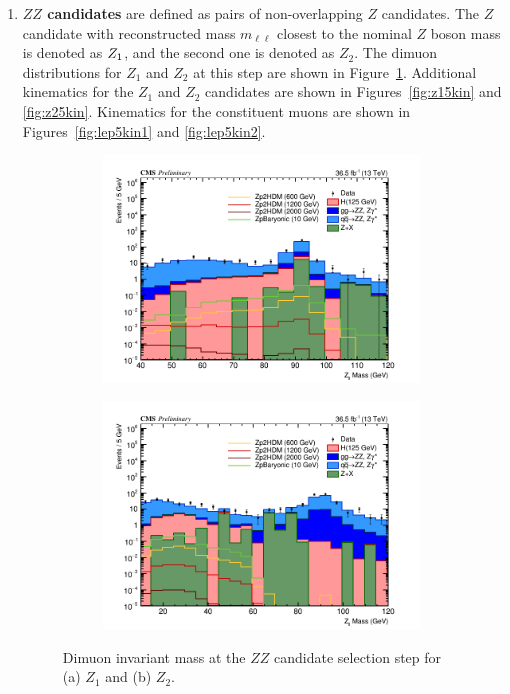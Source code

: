 \begin{enumerate}
\item {\bf $ZZ$ candidates} are defined as pairs of non-overlapping $Z$ candidates.
 The $Z$ candidate with reconstructed mass $m_{\ell\ell}$ closest to the nominal $Z$ boson
 mass is denoted as $Z_1$, and the second one is denoted as $Z_2$. The dimuon distributions for $Z_1$ and $Z_2$ at this step are shown in Figure~\ref{fig:dimuonz5}. Additional kinematics for the $Z_1$ and $Z_2$ candidates are shown in Figures~\ref{fig:z15kin} and \ref{fig:z25kin}. Kinematics for the constituent muons are shown in Figures~\ref{fig:lep5kin1} and \ref{fig:lep5kin2}.

\begin{figure}[tbh]
\begin{subfigure}{0.50\textwidth}
\centering
\includegraphics[width=3.3in]{figures/hist_hMZ1_5.png}
\caption{}
\end{subfigure}
\begin{subfigure}{0.50\textwidth}
\centering
\includegraphics[width=3.3in]{figures/hist_hMZ2_5.png}
\caption{}
\end{subfigure}
\caption{Dimuon invariant mass at the $ZZ$ candidate selection step for (a) $Z_1$ and (b) $Z_2$.}
\label{fig:dimuonz5}
\end{figure}


\end{enumerate}
